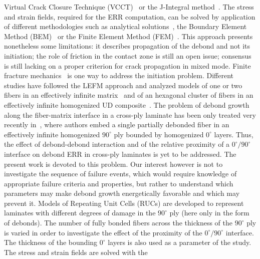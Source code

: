\documentclass[Review,sagev,times]{sagej}
\begin{document}
Virtual Crack Closure Technique (VCCT)~\cite{Krueger2004} or the J-Integral method~\cite{Rice1968}. The stress and strain fields, required for the ERR computation, can be solved by application of different methodologies such as analytical solutions~\cite{Toya1974}, the Boundary Element Method (BEM)~\cite{Paris1996} or the Finite Element Method (FEM)~\cite{Zhuang2018}. This approach presents nonetheless some limitations: it describes propagation of the debond and not its initiation; the role of friction in the contact zone is still an open issue; consensus is still lacking on a proper criterion for crack propagation in mixed mode. Finite fracture mechanics~\cite{MunozReja2016} is one way to address the initiation problem. Different studies have followed the LEFM approach and analyzed models of one or two fibers in an effectively infinite matrix~\cite{Correa2011,Correa2013,Correa2014,Sandino2016,Sandino2018} and of an hexagonal cluster of fibers in an effectively infinite homogenized UD composite~\cite{Varna2017,Zhuang2018}. The problem of debond growth along the fiber-matrix interface in a cross-ply laminate has been only treated very recently in~\cite{Velasco2018,Paris2018}, where authors embed a single partially debonded fiber in an effectively infinite homogenized $90^{\circ}$ ply bounded by homogenized $0^{\circ}$ layers. Thus, the effect of debond-debond interaction and of the relative proximity of a $0^{\circ}/90^{\circ}$ interface on debond ERR in cross-ply laminates is yet to be addressed. The present work is devoted to this problem.  Our interest however is not to investigate the sequence of failure events, which would require knowledge of appropriate failure criteria and properties, but rather to understand which parameters may make debond growth energetically favorable and which may prevent it. Models of Repeating Unit Cells (RUCs) are developed to represent laminates with different degrees of damage in the $90^{\circ}$ ply (here only in the form of debonds). The number of fully bonded fibers across the thickness of the $90^{\circ}$ ply is varied in order to investigate the effect of the proximity of the $0^{\circ}/90^{\circ}$ interface. The thickness of the bounding $0^{\circ}$ layers is also used as a parameter of the study. The stress and strain fields are solved with the 
\end{document}
